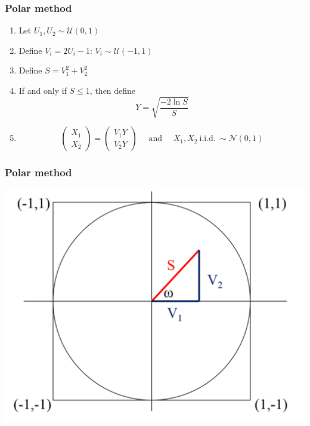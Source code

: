 \documentclass[10pt, compress]{beamer}
\begin{document}
\begin{frame}[fragile]
  \frametitle{Polar method}
  \begin{enumerate}
    \item Let $U_1, U_2 \sim \mathcal{U}(0,1)$
    \item Define $V_i = 2U_i - 1$: $V_i \sim \mathcal{U}(-1,1)$
    \item Define $S = V_1^2 + V_2^2$
    \item If and only if $S \leq 1$, then define
      \[ Y = \sqrt{\frac{-2\ln{S}}{S}} \]
    \item \[
        \left( \begin{matrix} X_1 \\ X_2 \end{matrix} \right) = \left( \begin{matrix} V_1 Y \\ V_2 Y \end{matrix} \right)
        \quad \text{ and } \quad X_1,X_2\ \text{i.i.d.}\ \sim \mathcal{N}(0,1)
      \]
  \end{enumerate}  
\end{frame}

\begin{frame}[fragile]
  \frametitle{Polar method}
  \includegraphics[width=\textwidth]{Picture2.png}
\end{frame}
\end{document}
